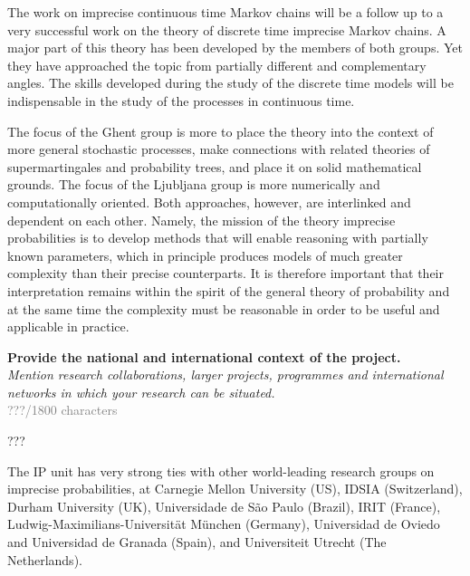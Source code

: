 \documentclass[11pt,dvipsnames,usenames,a4paper]{article}
\begin{document}
The work on imprecise continuous time Markov chains will be a follow up to a very successful work on the theory of discrete time imprecise Markov chains. A major part of this theory has been developed by the members of both groups. Yet they have approached the topic from partially different and complementary angles. The skills developed during the study of the discrete time models will be indispensable in the study of the processes in continuous time. 

The focus of the Ghent group is more to place the theory into the context of more general stochastic processes, make connections with related theories of supermartingales and probability trees, and place it on solid mathematical grounds. The focus of the Ljubljana group is more numerically and computationally oriented. Both approaches, however, are interlinked and dependent on each other. Namely, the mission of the theory imprecise probabilities is to develop methods that will enable reasoning with partially known parameters, which in principle produces models of much greater complexity than their precise counterparts. It is therefore important that their interpretation remains within the spirit of the general theory of probability and at the same time the complexity must be reasonable in order to be useful and applicable in practice. 




  


\textbf{Provide the national and international context of the project.}\\
\textit{Mention research collaborations, larger projects, programmes and international networks in which your research can be situated.}\\
\textcolor{Gray}{???/1800 characters}

???


The IP unit has very strong ties with other world-leading research groups on imprecise probabilities, at Carnegie Mellon University (US), IDSIA (Switzerland), Durham University (UK), Universidade de S\~ao Paulo (Brazil), IRIT (France), Ludwig-Maximilians-Universit\"at M\"unchen (Germany), Universidad de Oviedo and Universidad de Granada (Spain), and Universiteit Utrecht (The Netherlands).
\end{document}
